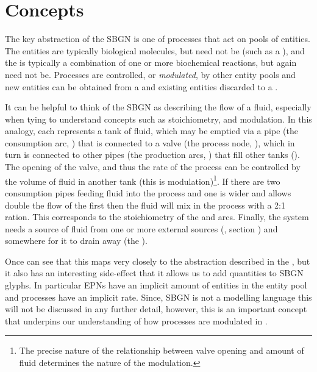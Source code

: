\section{Concepts}
\label{sec:concepts}

The key abstraction of the SBGN \PDl is one of processes that act on pools of entities. The entities are typically biological molecules, but need not be (such as a ), and the  is typically a combination of one or more  biochemical reactions, but again need not be. Processes are controlled, or \emph{modulated}, by other entity pools and new entities can be obtained from a  and existing entities discarded to a .

It can be helpful to think of the SBGN \PD as describing the flow of a fluid, especially when tying to understand concepts such as stoichiometry, and modulation. In this analogy, each  represents a tank of fluid, which may be emptied via a pipe (the consumption arc, ) that is connected to a valve (the process node, ), which in turn is connected to other pipes (the production arcs, ) that fill other tanks (). The opening of the valve, and thus the rate of the process can be controlled by the volume of fluid in another tank (this is modulation)\footnote{The precise nature of the relationship between valve opening and amount of fluid determines the nature of the modulation.}. If there are two consumption pipes feeding fluid into the process and one is wider and allows double the flow of the first then the fluid will mix in the process with a 2:1 ration. This corresponds to the stoichiometry of the  and  arcs. Finally, the system needs a source of fluid from one or more external sources (, section ) and somewhere for it to drain away (the ).

Once can see that this maps very closely to the abstraction described in the \PDl, but it also has an interesting side-effect that it allows us to add quantities to SBGN glyphs. In particular EPNs have an implicit amount of entities in the entity pool and processes have an implicit rate. Since, SBGN \PD is not a modelling language this will not be discussed in any further detail, however, this is an important concept that underpins our understanding of how processes are modulated in .


